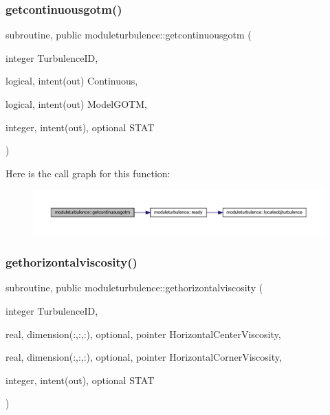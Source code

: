 \subsubsection{\texorpdfstring{getcontinuousgotm()}{getcontinuousgotm()}}
{\footnotesize\ttfamily subroutine, public moduleturbulence\+::getcontinuousgotm (\begin{DoxyParamCaption}\item[{integer}]{Turbulence\+ID,  }\item[{logical, intent(out)}]{Continuous,  }\item[{logical, intent(out)}]{Model\+G\+O\+TM,  }\item[{integer, intent(out), optional}]{S\+T\+AT }\end{DoxyParamCaption})}

Here is the call graph for this function\+:\nopagebreak
\begin{figure}[H]
\begin{center}
\leavevmode
\includegraphics[width=350pt]{namespacemoduleturbulence_a78bc503a0ceb792c161200d1e1e51bf0_cgraph}
\end{center}
\end{figure}
\mbox{\label{namespacemoduleturbulence_a37e3796794d913feea94c19ec07b14fb}} 
\subsubsection{\texorpdfstring{gethorizontalviscosity()}{gethorizontalviscosity()}}
{\footnotesize\ttfamily subroutine, public moduleturbulence\+::gethorizontalviscosity (\begin{DoxyParamCaption}\item[{integer}]{Turbulence\+ID,  }\item[{real, dimension(\+:,\+:,\+:), optional, pointer}]{Horizontal\+Center\+Viscosity,  }\item[{real, dimension(\+:,\+:,\+:), optional, pointer}]{Horizontal\+Corner\+Viscosity,  }\item[{integer, intent(out), optional}]{S\+T\+AT }\end{DoxyParamCaption})}

